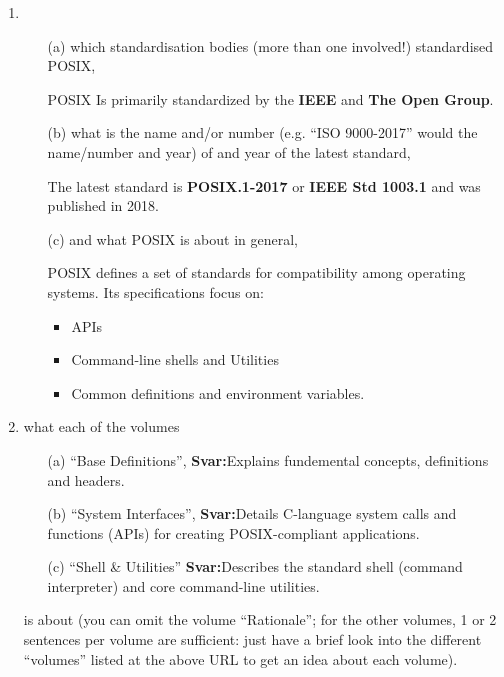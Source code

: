\documentclass{article}
\newcommand{\sv}{\textbf{Svar:}}
\newcommand{\bo}[1]{\textbf{#1}}
\begin{document}
\begin{enumerate}
    \item
    \begin{itemize}
        \item[(a)] which standardisation bodies (more than one involved!) standardised POSIX,
        
        POSIX Is primarily standardized by the \bo{IEEE} and \bo{The Open Group}.
        
        \item[(b)] what is the name and/or number (e.g. “ISO 9000-2017” would the name/number
        and year) of and year of the latest standard,

        The latest standard is \bo{POSIX.1-2017} or \bo{IEEE Std 1003.1} and was published in 2018.

        \item[(c)] and what POSIX is about in general,

        POSIX defines a set of standards for compatibility among operating systems. Its specifications focus on:
        \begin{itemize}
            \item APIs
            \item Command-line shells and Utilities
            \item Common definitions and environment variables.
        \end{itemize}

    \end{itemize} 
    
    \item what each of the volumes
    
    \begin{itemize}
        \item[(a)] “Base Definitions”,
                \sv Explains fundemental concepts, definitions and headers.
        \item[(b)] “System Interfaces”,
                \sv Details C-language system calls and functions (APIs) for creating POSIX-compliant applications.
        \item[(c)] “Shell \& Utilities” 
                \sv Describes the standard shell (command interpreter) and core command-line utilities.
    \end{itemize}
    is about (you can omit the volume “Rationale”; for the other volumes, 1 or 2 sentences
    per volume are sufficient: just have a brief look into the different “volumes” listed at the
    above URL to get an idea about each volume).



\end{enumerate}
\end{document}
